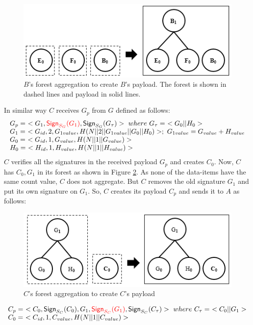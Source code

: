 		\begin{figure}[h!]
			\centering
			\includegraphics[scale=1]{images/b-forest-payload.png}
			\caption{$B$'s forest aggregation to create $B$'s payload.
			 				The forest is shown in dashed lines and payload in solid lines.}
			\label{fig:b-forest-payload}
		\end{figure}

		In similar way $C$ receives $G_{p}$ from $G$ defined as follows:
		\begin{equation}
			\begin{array}{l}
				G_{p} =\ <G_{1},\textcolor{red}{\textsf{Sign}_{S_{G}}(G_{1})}, \textsf{Sign}_{S_{G}}(G_{\tau})>\ where\ G_{\tau} =\ <G_{0} || H_{0}>\\
				G_{1} =\ < G_{id}, 2, G_{1value}, H(N||2||G_{1value}||G_{0}||H_{0})>;\ G_{1value} = G_{value} + H_{value} \\
				G_{0} =\ <G_{id}, 1, G_{value}, H(N||1||G_{value})>\\
				H_{0} =\ <H_{id}, 1, H_{value}, H(N||1||H_{value})>
			\end{array}
		\end{equation}
		$C$ verifies all the signatures in the received payload $G_{p}$ and creates $C_{0}$.
		Now, $C$ has $C_{0},G_{1}$ in its forest as shown in Figure \ref{fig:c-forest-payload}. 
		As none of the data-items have the same count value, $C$ does not aggregate.
		But $C$ removes the old signature $G_{1}$ and put its own signature on $G_{1}$.
		So, $C$ creates its payload $C_{p}$ and sends it to $A$ as follows:
		\begin{figure}[h!]
			\centering
			\includegraphics[scale=1]{images/c-forest-payload.png}
			\caption{$C$'s forest aggregation to create $C$'s payload }
			\label{fig:c-forest-payload}
		\end{figure}
		\begin{equation}
			\begin{array}{l}
				C_{p} =\ <C_{0},\textsf{Sign}_{S_{C}}(C_{0}),G_{1},\textcolor{red}{\textsf{Sign}_{S_{C}}(G_{1})}, \textsf{Sign}_{S_{C}}(C_{\tau})>\ where\ C_{\tau} =\ <C_{0} || G_{1}>\\
				C_{0} =\ <C_{id}, 1, C_{value}, H(N||1||C_{value})>
			\end{array}
			\label{eq:c-payload}
		\end{equation}

